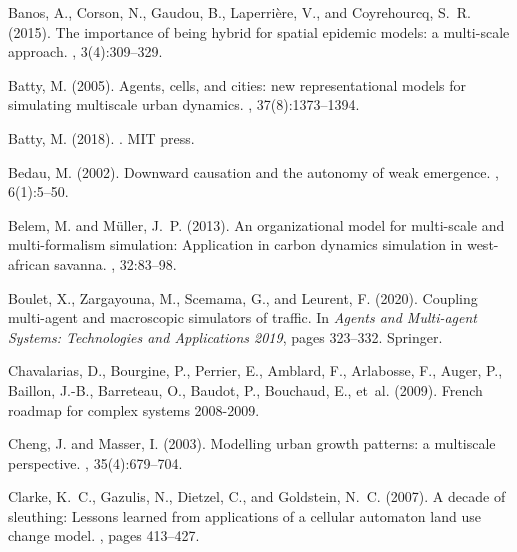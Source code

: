 \documentclass[11pt]{article}
\begin{document}
\begin{thebibliography}{}

Banos, A., Corson, N., Gaudou, B., Laperri{\`e}re, V., and Coyrehourcq, S.~R.
  (2015).
\newblock The importance of being hybrid for spatial epidemic models: a
  multi-scale approach.
, 3(4):309--329.

Batty, M. (2005).
\newblock Agents, cells, and cities: new representational models for simulating
  multiscale urban dynamics.
, 37(8):1373--1394.

Batty, M. (2018).
.
\newblock MIT press.

Bedau, M. (2002).
\newblock Downward causation and the autonomy of weak emergence.
,
  6(1):5--50.

Belem, M. and M{\"u}ller, J.~P. (2013).
\newblock An organizational model for multi-scale and multi-formalism
  simulation: Application in carbon dynamics simulation in west-african
  savanna.
, 32:83--98.

Boulet, X., Zargayouna, M., Scemama, G., and Leurent, F. (2020).
\newblock Coupling multi-agent and macroscopic simulators of traffic.
\newblock In {\em Agents and Multi-agent Systems: Technologies and Applications
  2019}, pages 323--332. Springer.

Chavalarias, D., Bourgine, P., Perrier, E., Amblard, F., Arlabosse, F., Auger,
  P., Baillon, J.-B., Barreteau, O., Baudot, P., Bouchaud, E., et~al. (2009).
\newblock French roadmap for complex systems 2008-2009.

Cheng, J. and Masser, I. (2003).
\newblock Modelling urban growth patterns: a multiscale perspective.
, 35(4):679--704.

Clarke, K.~C., Gazulis, N., Dietzel, C., and Goldstein, N.~C. (2007).
\newblock A decade of sleuthing: Lessons learned from applications of a
  cellular automaton land use change model.
, pages 413--427.


\end{thebibliography}
\end{document}
